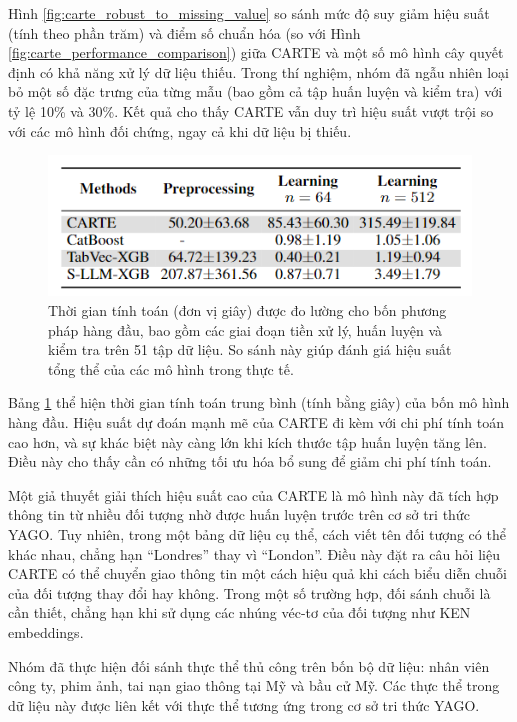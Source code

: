 \documentclass{article}
\begin{document}
Hình \ref{fig:carte_robust_to_missing_value} so sánh mức độ suy giảm hiệu suất (tính theo phần trăm) và điểm số chuẩn hóa (so với Hình \ref{fig:carte_performance_comparison}) giữa CARTE và một số mô hình cây quyết định có khả năng xử lý dữ liệu thiếu. Trong thí nghiệm, nhóm đã ngẫu nhiên loại bỏ một số đặc trưng của từng mẫu (bao gồm cả tập huấn luyện và kiểm tra) với tỷ lệ 10\% và 30\%. Kết quả cho thấy CARTE vẫn duy trì hiệu suất vượt trội so với các mô hình đối chứng, ngay cả khi dữ liệu bị thiếu.

\begin{figure} 
    \centering
    \includegraphics[scale = 0.8]{carte_computation_time.png}
    \caption{Thời gian tính toán (đơn vị giây) được đo lường cho bốn phương pháp hàng đầu, bao gồm các giai đoạn tiền xử lý, huấn luyện và kiểm tra trên 51 tập dữ liệu. So sánh này giúp đánh giá hiệu suất tổng thể của các mô hình trong thực tế.}
    \label{fig:carte_computation_time}
\end{figure}

Bảng \ref{fig:carte_computation_time} thể hiện thời gian tính toán trung bình (tính bằng giây) của bốn mô hình hàng đầu. Hiệu suất dự đoán mạnh mẽ của CARTE đi kèm với chi phí tính toán cao hơn, và sự khác biệt này càng lớn khi kích thước tập huấn luyện tăng lên. Điều này cho thấy cần có những tối ưu hóa bổ sung để giảm chi phí tính toán.

Một giả thuyết giải thích hiệu suất cao của CARTE là mô hình này đã tích hợp thông tin từ nhiều đối tượng nhờ được huấn luyện trước trên cơ sở tri thức YAGO. Tuy nhiên, trong một bảng dữ liệu cụ thể, cách viết tên đối tượng có thể khác nhau, chẳng hạn “Londres” thay vì “London”. Điều này đặt ra câu hỏi liệu CARTE có thể chuyển giao thông tin một cách hiệu quả khi cách biểu diễn chuỗi của đối tượng thay đổi hay không. Trong một số trường hợp, đối sánh chuỗi là cần thiết, chẳng hạn khi sử dụng các nhúng véc-tơ của đối tượng như KEN embeddings.

Nhóm đã thực hiện đối sánh thực thể thủ công trên bốn bộ dữ liệu: nhân viên công ty, phim ảnh, tai nạn giao thông tại Mỹ và bầu cử Mỹ. Các thực thể trong dữ liệu này được liên kết với thực thể tương ứng trong cơ sở tri thức YAGO.
\end{document}
